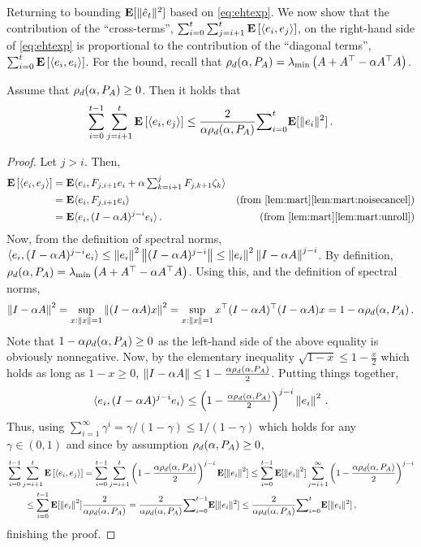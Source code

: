 Returning to bounding $\mathbf{E}[ \| \hat{e}_t\|^2 ]$ based on \eqref{eq:ehtexp}.
We now show that the contribution of the ``cross-terms'', $\sum_{i=0}^t \sum_{j=i+1}^t \mathbf{E}\left[ \langle e_i,e_j\rangle \right]$, 
on the right-hand side of \eqref{eq:ehtexp}
is proportional to the contribution of the ``diagonal terms'', $\sum_{i=0}^t \mathbf{E}\left[ \langle e_i,e_i\rangle \right]$.
For the bound, recall that $\rho_d(\alpha,P_A) = \lambda_{\min}\left( A + A^\top - \alpha A^\top A \right)$.
\begin{lemma}
\label{lem:crosstermbound}
Assume that $\rho_d(\alpha,P_A)\ge 0$. Then it holds that
\begin{align*}
\sum_{i=0}^{t-1}\sum_{j=i+1}^t {\mathbf{E}\left[\langle e_i,e_j\rangle\right]} \le
 \frac2{\alpha\rho_d(\alpha,P_A)}{\sum}_{i=0}^{t} \mathbf{E}[\| e_i\|^2 ]\,.
\end{align*}
\end{lemma}
\begin{proof}
Let $j>i$. Then, 
\begin{align*}
\EE{\ip{e_i,e_j}}
&=\E \ip{e_i, F_{j,i+1} e_i+\alpha\textstyle\sum_{k=i+1}^j F_{j,k+1}\zeta_{k} }\\
&=\E\ip{e_i,F_{j,i+1} e_i}  &\text{(from \cref{lem:mart}\ref{lem:mart:noisecancel})}\\
&=\E\ip{e_i, (I-\alpha A)^{j-i} e_i}\,. & \text{(from \cref{lem:mart}\ref{lem:mart:unroll})}
\end{align*}
Now, from the definition of spectral norms, $\langle e_i, (I-\alpha A)^{j-i} e_i \rangle \le \left\| e_i\right\|^2 \left\| (I-\alpha A)^{j-i}\right\|
\le \left\| e_i\right\|^2 \left\|  I-\alpha A \right\|^{j-i}$.
By definition, $\rho_d(\alpha,P_A) = \lambda_{\min}\left( A + A^\top - \alpha A^\top A \right)$.
Using this, and the definition of spectral norms,
\begin{align*}
\left\| I-\alpha A\right\|^2 = \sup_{x:\left\| x\right\|=1} \left\|  (I-\alpha A) x \right\|^2 = \sup_{x:\left\| x\right\|=1} x^\top (I-\alpha A)^\top (I-\alpha A) x = 1- \alpha \rho_d(\alpha,P_A)\,.
\end{align*}
Note that $1-\alpha \rho_d(\alpha,P_A)\ge 0$ as the left-hand side of the above equality is obviously nonnegative.
Now, by the elementary inequality $\sqrt{1-x} \le 1- \frac{x}{2}$ which holds as long as $1-x\ge 0$,
$\left\| I-\alpha A\right\| \le 1- \frac{\alpha \rho_d(\alpha,P_A)}{2}$. Putting things together,
\begin{align*}
\langle e_i, (I-\alpha A)^{j-i} e_i \rangle \le \left(1- \tfrac{\alpha \rho_d(\alpha,P_A)}{2} \right)^{j-i} \left\| e_i\right\|^2 \,.
\end{align*}
Thus, using $\sum_{i=1}^\infty \gamma^i 
= \gamma/(1-\gamma) \le 1/(1-\gamma)$ which holds for any $\gamma\in (0,1)$
and since by assumption $\rho_d(\alpha,P_A)\ge 0$,
\begin{align*}
\label{inter}
\MoveEqLeft 
\sum_{i=0}^{t-1}\sum_{j=i+1}^t {\EE{\ip{e_i,e_j}}}
=\sum_{i=0}^{t-1}\sum_{j=i+1}^t \left(1-\frac{\alpha\rhod{P_A}}{2}\right)^{j-i} \E[\norm{e_i}^2]
\leq \sum_{i=0}^{t-1} \E[\norm{e_i}^2] \sum_{j=i+1}^\infty \left(1-\frac{\alpha\rhod{P_A}}{2}\right)^{j-i} \\
&\leq \sum_{i=0}^{t-1} \E[\norm{e_i}^2] \frac{2}{\alpha \rhod{P_A}}
=\frac2{\alpha\rhod{P_A}} {\sum}_{i=0}^{t-1}\E[\normsm{e_i}^2]
\leq \frac2{\alpha\rhod{P_A}}{\sum}_{i=0}^{t}\E[\normsm{e_i}^2]\,,
\end{align*}
finishing the proof.
\end{proof}


